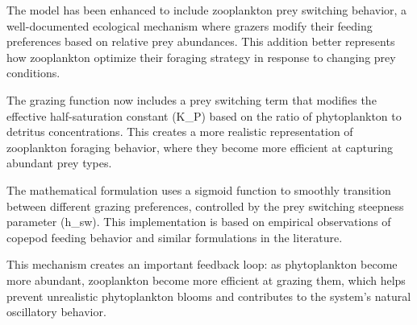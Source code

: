 The model has been enhanced to include zooplankton prey switching behavior, a well-documented ecological mechanism where grazers modify their feeding preferences based on relative prey abundances. This addition better represents how zooplankton optimize their foraging strategy in response to changing prey conditions.

The grazing function now includes a prey switching term that modifies the effective half-saturation constant (K_P) based on the ratio of phytoplankton to detritus concentrations. This creates a more realistic representation of zooplankton foraging behavior, where they become more efficient at capturing abundant prey types.

The mathematical formulation uses a sigmoid function to smoothly transition between different grazing preferences, controlled by the prey switching steepness parameter (h_sw). This implementation is based on empirical observations of copepod feeding behavior and similar formulations in the literature.

This mechanism creates an important feedback loop: as phytoplankton become more abundant, zooplankton become more efficient at grazing them, which helps prevent unrealistic phytoplankton blooms and contributes to the system's natural oscillatory behavior.
